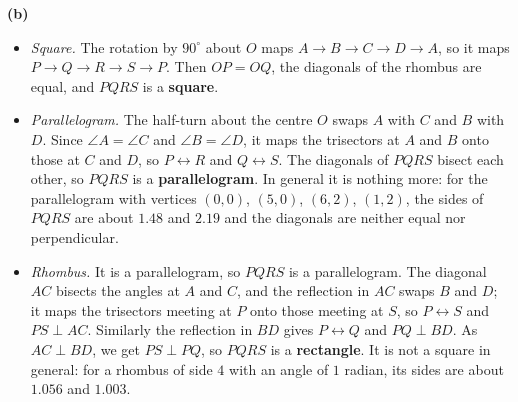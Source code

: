 \textbf{(b)}
\begin{itemize}
\item \emph{Square.} The rotation by $90^\circ$ about $O$ maps $A\to B\to C\to D\to A$, so it maps $P\to Q\to R\to S\to P$. Then $OP=OQ$, the diagonals of the rhombus are equal, and $PQRS$ is a \textbf{square}.
\item \emph{Parallelogram.} The half-turn about the centre $O$ swaps $A$ with $C$ and $B$ with $D$. Since $\angle A=\angle C$ and $\angle B=\angle D$, it maps the trisectors at $A$ and $B$ onto those at $C$ and $D$, so $P\leftrightarrow R$ and $Q\leftrightarrow S$. The diagonals of $PQRS$ bisect each other, so $PQRS$ is a \textbf{parallelogram}. In general it is nothing more: for the parallelogram with vertices $(0,0)$, $(5,0)$, $(6,2)$, $(1,2)$, the sides of $PQRS$ are about $1.48$ and $2.19$ and the diagonals are neither equal nor perpendicular.
\item \emph{Rhombus.} It is a parallelogram, so $PQRS$ is a parallelogram. The diagonal $AC$ bisects the angles at $A$ and $C$, and the reflection in $AC$ swaps $B$ and $D$; it maps the trisectors meeting at $P$ onto those meeting at $S$, so $P\leftrightarrow S$ and $PS\perp AC$. Similarly the reflection in $BD$ gives $P\leftrightarrow Q$ and $PQ\perp BD$. As $AC\perp BD$, we get $PS\perp PQ$, so $PQRS$ is a \textbf{rectangle}. It is not a square in general: for a rhombus of side $4$ with an angle of $1$ radian, its sides are about $1.056$ and $1.003$.
\end{itemize}
